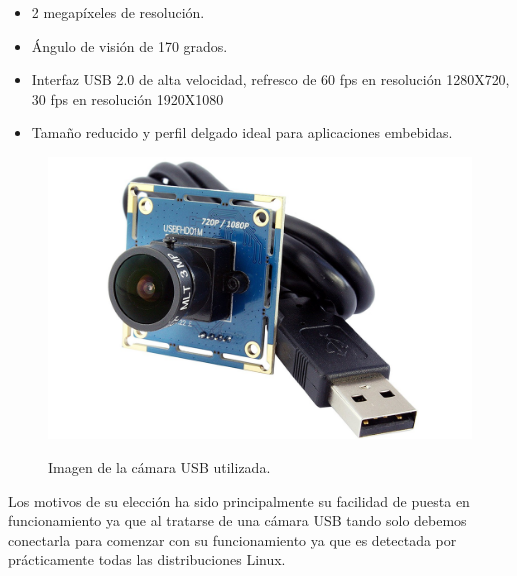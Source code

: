 \begin{itemize}
\item 2 megapíxeles de resolución.
\item Ángulo de visión de 170 grados.
\item Interfaz USB 2.0 de alta velocidad, refresco de 60 fps en resolución 1280X720, 30 fps en resolución 1920X1080
\item Tamaño reducido y perfil delgado ideal para aplicaciones embebidas.
\end{itemize}

\begin{figure}[H]
  \begin{center}
    \includegraphics[scale=0.15]{imagenes/robot/camara-usb.jpg}\\
    \caption{Imagen de la cámara USB utilizada.}
  \end{center}
\end{figure}

Los motivos de su elección ha sido principalmente su facilidad de puesta en funcionamiento ya que al tratarse de una cámara USB tando solo debemos conectarla para comenzar con su funcionamiento ya que es detectada 
por prácticamente todas las distribuciones Linux. 